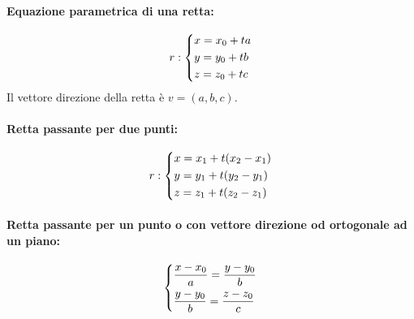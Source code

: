 \documentclass[a4paper]{article}
\begin{document}
                \noindent
                \parbox{0.3 \linewidth}{
                        \paragraph{Equazione parametrica di una retta:}
                                \[
                                        r: \begin{dcases}
                                                x = x_0 + ta \\
                                                y = y_0 + tb \\
                                                z = z_0 + tc
                                        \end{dcases}
                                \]
                                Il vettore direzione della retta \`{e} $ v =(a, b, c) $.
                } \hspace{20pt}
                \parbox{0.3 \linewidth}{
                        \paragraph{Retta passante per due punti:}
                                \[
                                        r: \begin{dcases}
                                                x = x_1 + t (x_2 - x_1)\\
                                                y = y_1 + t (y_2 - y_1)\\
                                                z = z_1 + t (z_2 - z_1)
                                        \end{dcases}
                                \]
                } \hspace{20pt}
                \parbox{0.3 \linewidth}{
                        \paragraph{Retta passante per un punto o con vettore direzione od ortogonale ad un piano:}
                                \[
                                \begin{dcases}
                                        \frac{x - x_0}{a} = \frac{y - y_0}{b} \\
                                        \frac{y - y_0}{b} = \frac{z - z_0}{c}
                                \end{dcases}
                                \]
                }
\end{document}
